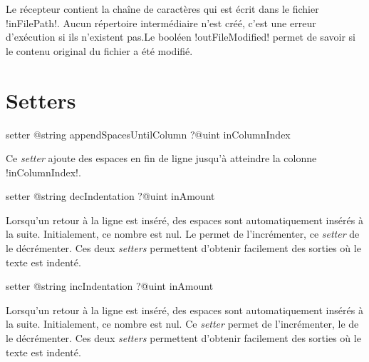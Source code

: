 Le récepteur contient la chaîne de caractères qui est écrit dans le fichier \ggs!inFilePath!. Aucun répertoire intermédiaire n'est créé, c'est une erreur d'exécution si ils n'existent pas.Le booléen \ggs!outFileModified! permet de savoir si le contenu original du fichier a été modifié.















\section{Setters}


\begin{galgasbox}
setter @string appendSpacesUntilColumn ?@uint inColumnIndex
\end{galgasbox}

Ce \emph{setter} ajoute des espaces en fin de ligne jusqu'à atteindre la colonne \ggs!inColumnIndex!.





\begin{galgasbox}
setter @string decIndentation ?@uint inAmount
\end{galgasbox}

Lorsqu'un retour à la ligne est inséré, des espaces sont automatiquement insérés à la suite. Initialement, ce nombre est nul. Le  permet de l'incrémenter, ce \emph{setter} de le décrémenter. Ces deux \emph{setters} permettent d'obtenir facilement des sorties où le texte est indenté.






\begin{galgasbox}
setter @string incIndentation ?@uint inAmount
\end{galgasbox}

Lorsqu'un retour à la ligne est inséré, des espaces sont automatiquement insérés à la suite. Initialement, ce nombre est nul. Ce \emph{setter} permet de l'incrémenter, le  de le décrémenter. Ces deux \emph{setters} permettent d'obtenir facilement des sorties où le texte est indenté.








